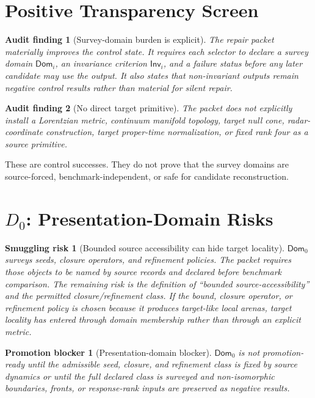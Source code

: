 \documentclass[11pt]{article}
\newcommand{\Dom}{\mathsf{Dom}}
\newcommand{\Inv}{\mathsf{Inv}}
\newtheorem{auditfinding}{Audit finding}
\newtheorem{smugglingrisk}{Smuggling risk}
\newtheorem{promotionblocker}{Promotion blocker}
\begin{document}
\section{Positive Transparency Screen}

\begin{auditfinding}[Survey-domain burden is explicit]
The repair packet materially improves the control state. It requires each
selector to declare a survey domain \(\Dom_i\), an invariance criterion
\(\Inv_i\), and a failure status before any later candidate may use the
output. It also states that non-invariant outputs remain negative control
results rather than material for silent repair.
\end{auditfinding}

\begin{auditfinding}[No direct target primitive]
The packet does not explicitly install a Lorentzian metric, continuum
manifold topology, target null cone, radar-coordinate construction, target
proper-time normalization, or fixed rank four as a source primitive.
\end{auditfinding}

These are control successes. They do not prove that the survey domains are
source-forced, benchmark-independent, or safe for candidate reconstruction.

\section{\texorpdfstring{\(D_0\)}{D0}: Presentation-Domain Risks}

\begin{smugglingrisk}[Bounded source accessibility can hide target locality]
\(\Dom_0\) surveys seeds, closure operators, and refinement policies. The
packet requires those objects to be named by source records and declared
before benchmark comparison. The remaining risk is the definition of
``bounded source-accessibility'' and the permitted closure/refinement class.
If the bound, closure operator, or refinement policy is chosen because it
produces target-like local arenas, target locality has entered through domain
membership rather than through an explicit metric.
\end{smugglingrisk}

\begin{promotionblocker}[Presentation-domain blocker]
\(\Dom_0\) is not promotion-ready until the admissible seed, closure, and
refinement class is fixed by source dynamics or until the full declared class
is surveyed and non-isomorphic boundaries, fronts, or response-rank inputs are
preserved as negative results.
\end{promotionblocker}
\end{document}
